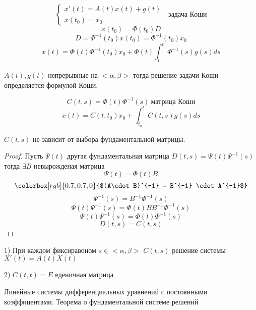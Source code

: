 \begin{block}
  $$
  \left\{
  \begin{array}{l}
    x'(t) = A(t)x(t) + g(t) \\
    x(t_0) = x_0
  \end{array}
  \right. ~~~ \text{задача Коши}
  $$
  $$
  x(t_0) = \Phi(t_0)D
  $$
  $$
  D = \Phi^{-1}(t_0)x(t_0) = \Phi^{-1}(t_0)x_0
  $$
  $$
  x(t) = \Phi(t) \Phi^{-1}(t_0)x_0 + \Phi(t)\int_{t_0}^t \Phi^{-1}(s)g(s)ds
  $$
\end{block}

\begin{theorem}
  $A(t), g(t)$ непрерывные на $<\alpha, \beta>$ тогда
  решение задачи Коши определяется формулой Коши.
\end{theorem}

\begin{define}
  $$
  C(t,s) = \Phi(t)\Phi^{-1}(s) ~ \text{матрица Коши}
  $$
  $$
  x(t) = C(t, t_0)x_0 + \int_{t_0}^t C(t,s)g(s)ds
  $$
\end{define}

\begin{theorem}
  $C(t,s)$ не зависит от выбора фундаментальной матрицы.
\end{theorem}

\begin{proof}
  Пусть $\Psi(t)$ другая фундаментальная матрица $D(t,s) = \Psi(t)\Psi^{-1}(s)$
  тогда $\exists B$ невырожденая матрица
  $$
  \Psi(t) = \Phi(t)B
  $$
  $$
  \colorbox[rgb]{0.7,0.7,0}{$(A\cdot B)^{-1} = B^{-1} \cdot A^{-1}$}
  $$
  $$
  \Psi^{-1}(s) = B^{-1} \Phi^{-1}(s)
  $$
  $$
  \Psi(t) \Psi^{-1}(s) = \Phi(t) B B^{-1} \Phi^{-1}(s)
  $$
  $$
  \Psi(t) \Psi^{-1}(s) = \Phi(t) \Phi^{-1}(s)
  $$
  $$
  D(t, s) = C(t, s)
  $$
\end{proof}

\begin{block}[Свойства]
  1) При каждом фиксиравоном $s \in <\alpha, \beta>$ $C(t, s)$ решение системы
  $X'(t) = A(t)X(t)$

  2) $C(t,t) = E$ еденичная матрица
\end{block}

\begin{title}[\Large]
  Линейные системы дифференциальных уравнений с постоянными коэффицентами.
  Теорема о фундаментальной системе решений
\end{title}


